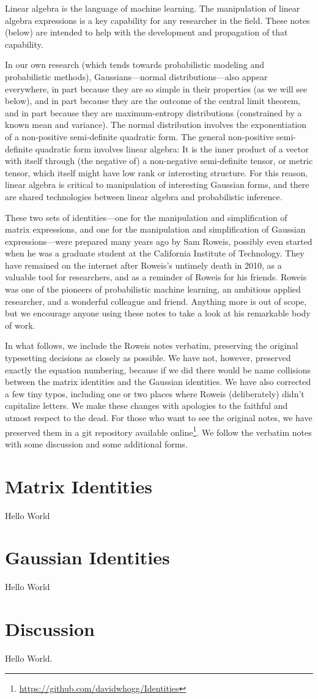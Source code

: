 \documentclass[12pt]{article}
\begin{document}
Linear algebra is the language of machine learning.
The manipulation of linear algebra expressions is a key capability for
any researcher in the field.
These notes (below) are intended to help with the development and
propagation of that capability.

In our own research (which tends towards probabilistic modeling and
probabilistic methods), Gaussians---normal distributions---also appear
everywhere, in part because they are so simple in their properties
(as we will see below), and in part because
they are the outcome of the central limit theorem, and in part
because they are maximum-entropy distributions (constrained by
a known mean and variance).
The normal distribution involves the exponentiation of a
non-positive semi-definite quadratic form.
The general non-positive semi-definite quadratic form involves linear
algebra:
It is the inner product of a vector with itself through (the negative
of) a non-negative semi-definite tensor, or metric tensor, which
itself might have low rank or interesting structure.
For this reason, linear algebra is critical to manipulation of
interesting Gaussian forms, and there are shared technologies between
linear algebra and probabilistic inference.

These two sets of identities---one for the manipulation and
simplification of matrix expressions, and one for the manipulation and
simplification of Gaussian expressions---were prepared many years ago
by Sam Roweis, possibly even started when he was a graduate
student at the California Institute of Technology.
They have remained on the internet after Roweis's untimely death in 2010,
as a valuable tool for researchers, and as a reminder of Roweis for his
friends.
Roweis was one of the pioneers of probabilistic machine learning, an ambitious
applied researcher, and a wonderful colleague and friend.
Anything more is out of scope, but we encourage anyone using these notes to
take a look at his remarkable body of work.

In what follows, we include the Roweis notes verbatim, preserving
the original typesetting decisions as closely as possible.
We have not, however, preserved exactly the equation numbering,
because if we did there would be name collisions between the matrix identities
and the Gaussian identities.
We have also corrected a few tiny typos, including one or two places where
Roweis (deliberately) didn't capitalize letters.
We make these changes with apologies to the faithful and utmost respect to the dead.
For those who want to see the original notes, we have preserved them in a git
repository available online\footnote{\url{https://github.com/davidwhogg/Identities}}.
We follow the verbatim notes with some discussion and some additional forms.

\clearpage
\section{Matrix Identities}

Hello World

\clearpage
\section{Gaussian Identities}

Hello World

\clearpage
\section{Discussion}

Hello World.
\end{document}
